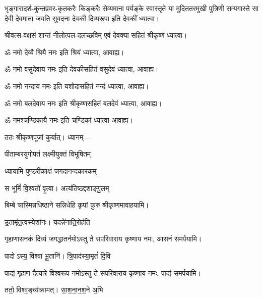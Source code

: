 \begin{center}

{भृङ्गारादर्श-कुन्तप्रवर-कृतकरैः किङ्करैः सेव्यमाना}
{पर्यङ्के स्वास्तृते या मुदिततरमुखी पुत्रिणी सम्यगास्ते}
{सा देवी देवमाता जयति सुवदना देवकी दिव्यरूपा} 
इति देवकीं ध्यात्वा।

{श्रीवत्स-वक्षसं शान्तं नीलोत्पल-दलच्छविम्}
एवं देवक्या सहितं श्रीकृष्णं ध्यात्वा।

ॐ नमो देव्यै श्रियै नमः इति श्रियं ध्यात्वा, आवाह्य।

ॐ नमो वसुदेवाय नमः इति देवकीसहितं वसुदेवं ध्यात्वा, आवाह्य।

ॐ नमो नन्दाय नमः इति यशोदासहितं नन्दं ध्यात्वा, आवाह्य।

ॐ नमो बलदेवाय नमः इति श्रीकृष्णसहितं बलदेवं ध्यात्वा, आवाह्य।

ॐ नमश्चण्डिकायै नमः इति चण्डिकां ध्यात्वा आवाह्य।

ततः श्रीकृष्णपूजां कुर्यात्। ध्यानम्—

\renewcommand{\devAya}{सपरिवाराय कृष्णाय नमः,}
\medskip

{पीताम्बरयुगोपतं लक्ष्मीयुक्तं विभूषितम्}

{ध्यायामि पुण्डरीकाक्षं जगदानन्दकारकम्}
\medskip

{स भूमिं॑ वि॒श्वतो॑ वृ॒त्वा। अत्य॑तिष्ठद्दशाङ्गु॒लम्}

{बिम्बे चास्मिन्नधिष्ठाने सन्निधेहि कृपां कुरु}
श्रीकृष्णमावाहयामि।
\medskip

{उ॒तामृ॑त॒त्वस्येशा॑नः। यदन्ने॑नाति॒रोह॑ति}

{गृहाणासनकं दिव्यं जगद्धातर्नमोऽस्तु ते}
\devAya{} आसनं समर्पयामि।
\medskip

{पादोऽस्य॒ विश्वा॑ भू॒तानि॑। त्रि॒पाद॑स्या॒मृतं॑ दि॒वि}

{पाद्यं गृहाण दैत्यारे विश्वरूप नमोऽस्तु ते}
\devAya{} पाद्यं समर्पयामि।
\medskip

{ततो॒ विश्व॒ङ्व्य॑क्रामत्। सा॒श॒ना॒न॒श॒ने अ॒भि}


\end{center}
